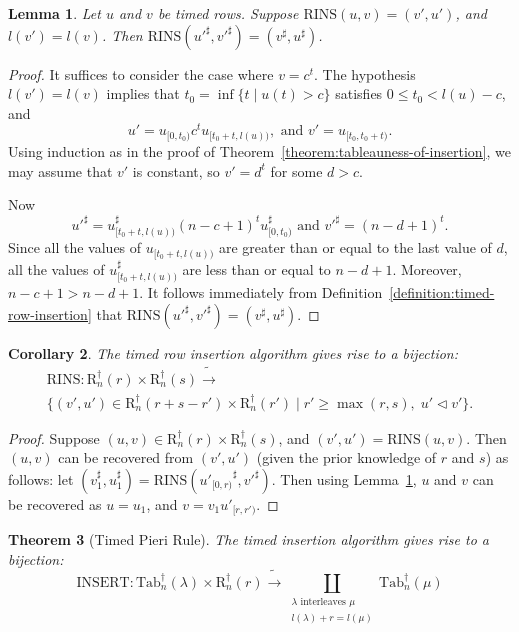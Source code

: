 \documentclass[10pt]{amsproc}
\newtheorem{theorem}{Theorem}[subsection]
\newtheorem{lemma}[theorem]{Lemma}
\newtheorem{corollary}[theorem]{Corollary}
\theoremstyle{definition}
\theoremstyle{remark}
\newcommand{\rowins}{\mathrm{RINS}}
\newcommand{\ins}{\mathrm{INSERT}}
\newcommand{\ttab}{\mathrm{Tab}^\dagger}
\newcommand{\tr}{\mathrm{R}^\dagger}
\begin{document}
\begin{lemma}
  \label{lemma:reverse-row-insertion}
  Let $u$ and $v$ be timed rows.
  Suppose $\rowins(u,v)=(v',u')$, and $l(v')=l(v)$.
  Then $\rowins({u'}^\sharp,{v'}^\sharp)=(v^\sharp,u^\sharp)$.
\end{lemma}
\begin{proof}
  It suffices to consider the case where $v=c^t$.
  The hypothesis $l(v')=l(v)$ implies that $t_0=\inf\{t\mid u(t)>c\}$ satisfies $0\leq t_0<l(u)-c$, and
  \begin{displaymath}
    u'=u_{[0,t_0)}c^tu_{[t_0+t,l(u))}, \text{ and } v'=u_{[t_0,t_0+t)}.
  \end{displaymath}
  Using induction as in the proof of Theorem~\ref{theorem:tableauness-of-insertion}, we may assume that $v'$ is constant, so $v'=d^t$ for some $d>c$.

  Now
  \begin{displaymath}
    {u'}^\sharp=u_{[t_0+t,l(u))}^\sharp (n-c+1)^t u_{[0,t_0)}^\sharp \text{ and } {v'}^\sharp=(n-d+1)^t.
  \end{displaymath}
  Since all the values of $u_{[t_0+t,l(u))}$ are greater than or equal to the last value of $d$, all the values of $u_{[t_0+t,l(u))}^\sharp$ are less than or equal to $n-d+1$.
  Moreover, $n-c+1>n-d+1$.
  It follows immediately from Definition~\ref{definition:timed-row-insertion} that $\rowins({u'}^\sharp,{v'}^\sharp)=(v^\sharp,u^\sharp)$.
\end{proof}
\begin{corollary}
  \label{corollary:row-insertion-bijection}
  The timed row insertion algorithm gives rise to a bijection:
  \begin{multline*}
    \rowins: \tr_n(r)\times \tr_n(s) \tilde\to \\\{(v',u')\in \tr_n(r+s-r')\times \tr_n(r')\mid r'\geq \max(r,s),\; u'\lhd v'\}. 
  \end{multline*}
\end{corollary}
\begin{proof}
  Suppose $(u,v)\in \tr_n(r)\times \tr_n(s)$, and $(v',u')=\rowins(u,v)$.
  Then $(u,v)$ can be recovered from $(v',u')$ (given the prior knowledge of $r$ and $s$) as follows:
  let $(v_1^\sharp, u_1^\sharp)=\rowins({u'_{[0,r)}}^\sharp, {v'}^\sharp)$.
  Then using Lemma~\ref{lemma:reverse-row-insertion}, $u$ and $v$ can be recovered as $u=u_1$, and $v=v_1u'_{[r,r')}$.
\end{proof}
\begin{theorem}[Timed Pieri Rule]
  \label{theorem:pieri}
  The timed insertion algorithm gives rise to a bijection:
  \begin{displaymath}
    \ins: \ttab_n(\lambda)\times \tr_n(r) \tilde\to \coprod_{\begin{smallmatrix}\text{$\lambda$ interleaves $\mu$}\\{l(\lambda)+r = l(\mu)}\end{smallmatrix}} \ttab_n(\mu)
  \end{displaymath}
\end{theorem}
\end{document}
